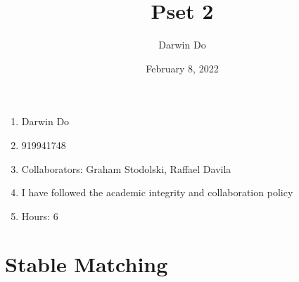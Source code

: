 \documentclass{article}
\title{Pset 2}
\begin{document}
\date{February 8, 2022 }
\author{Darwin Do}

\maketitle

\begin{enumerate}[label=(\alph*)]
    \item Darwin Do
    \item 919941748
    \item Collaborators: Graham Stodolski, Raffael Davila
    \item I have followed the academic integrity and collaboration policy
    \item Hours: 6
\end{enumerate}

\newpage

\section{Stable Matching}
\end{document}
